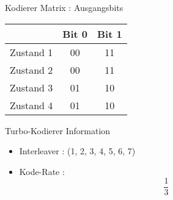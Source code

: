 \begin{frame}{Kodierer Matrix : Ausgangsbits}

\begin{longtable}[c]{@{}lcc@{}}
\toprule
& Bit 0 & Bit 1\tabularnewline
\midrule
\endhead
Zustand 1 & 00 & 11\tabularnewline
Zustand 2 & 00 & 11\tabularnewline
Zustand 3 & 01 & 10\tabularnewline
Zustand 4 & 01 & 10\tabularnewline
\bottomrule
\end{longtable}

\end{frame}

\begin{frame}{Turbo-Kodierer Information}

\begin{itemize}
\tightlist
\item
  Interleaver : (1, 2, 3, 4, 5, 6, 7)
\item
  Kode-Rate : \[\frac{1}{3}\]
\end{itemize}

\end{frame}

